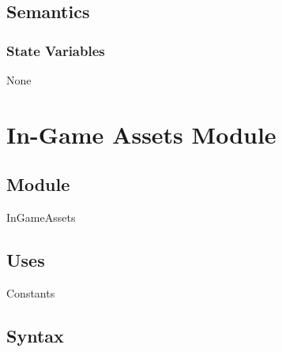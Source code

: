 \documentclass[12pt, titlepage]{article}
\begin{document}
\subsection* {Semantics}

\subsubsection* {State Variables}

None

\newpage


\section* {In-Game Assets Module}

\subsection*{Module}
\noindent InGameAssets

\subsection*{Uses}
\noindent Constants

\subsection*{Syntax}
\end{document}
